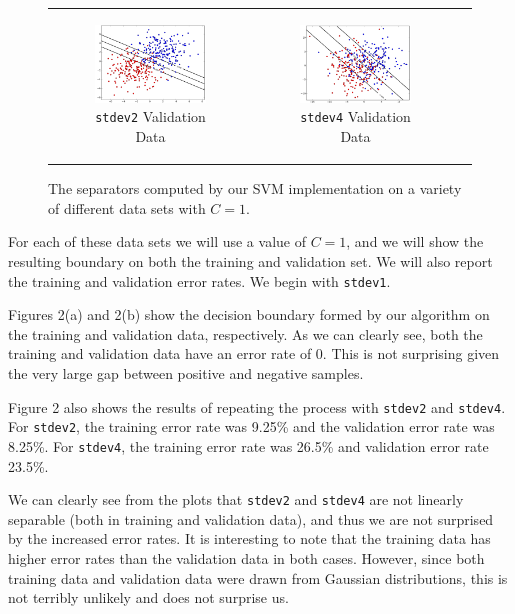 \documentclass{sigchi}
\begin{document}
\begin{figure}[!ht]
\begin{tabular}{c c c}
\begin{subfigure}[b]{2.25in}
	\includegraphics[width=2.25in]{plots/1-3/casey/stdev2c1val.png}
	\caption{\texttt{stdev2} Validation Data}
\end{subfigure} &

\begin{subfigure}[b]{2.25in}
	\includegraphics[width=2.25in]{plots/1-3/casey/stdev4c1val.png}
	\caption{\texttt{stdev4} Validation Data}
\end{subfigure} \\
\end{tabular}
\caption{The separators computed by our SVM implementation on a variety of different data sets with $C = 1$.}
\end{figure}

For each of these data sets we will use a value of $C = 1$, and we will show the resulting boundary on both the training and validation set. We will also report the training and validation error rates. We begin with \texttt{stdev1}.

Figures 2(a) and 2(b) show the decision boundary formed by our algorithm on the training and validation data, respectively. As we can clearly see, both the training and validation data have an error rate of 0. This is not surprising given the very large gap between positive and negative samples.

Figure 2 also shows the results of repeating the process with \texttt{stdev2} and \texttt{stdev4}. For \texttt{stdev2}, the training error rate was 9.25\% and the validation error rate was 8.25\%. For \texttt{stdev4}, the training error rate was 26.5\% and validation error rate 23.5\%.

We can clearly see from the plots that \texttt{stdev2} and \texttt{stdev4} are not linearly separable (both in training and validation data), and thus we are not surprised by the increased error rates. It is interesting to note that the training data has higher error rates than the validation data in both cases. However, since both training data and validation data were drawn from Gaussian distributions, this is not terribly unlikely and does not surprise us.
\end{document}
